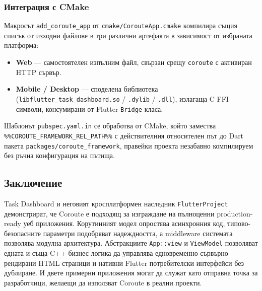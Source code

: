 \subsubsection{Интеграция с CMake}

Макросът \texttt{add\_coroute\_app} от \texttt{cmake/CorouteApp.cmake} компилира същия списък от изходни файлове в три различни артефакта в зависимост от избраната платформа:
\begin{itemize}
    \item \textbf{Web} --- самостоятелен изпълним файл, свързан срещу \texttt{coroute} с активиран HTTP сървър.
    \item \textbf{Mobile / Desktop} --- споделена библиотека (\texttt{libflutter\_task\_dashboard.so} / \texttt{.dylib} / \texttt{.dll}), излагаща C FFI символи, консумирани от Flutter \texttt{Bridge} класа.
\end{itemize}

Шаблонът \texttt{pubspec.yaml.in} се обработва от CMake, който замества \texttt{\%\%COROUTE\_FRAMEWORK\_REL\_PATH\%\%} с действителния относителен път до Dart пакета \texttt{packages/coroute\_framework}, правейки проекта незабавно компилируем без ръчна конфигурация на пътища.

\subsection{Заключение}

Task Dashboard и неговият кросплатформен наследник \texttt{FlutterProject} демонстрират, че Coroute е подходящ за изграждане на пълноценни production-ready уеб приложения. Корутинният модел опростява асинхронния код, типово-безопасните параметри подобряват надеждността, а middleware системата позволява модулна архитектура. Абстракциите \texttt{App::view} и \texttt{ViewModel} позволяват едната и съща C++ бизнес логика да управлява едновременно сървърно рендирани HTML страници и нативни Flutter потребителски интерфейси без дублиране. И двете примерни приложения могат да служат като отправна точка за разработчици, желаещи да използват Coroute в реални проекти.
